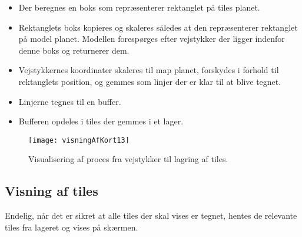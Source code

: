 \begin{itemize}
	\item Der beregnes en boks som repræsenterer rektanglet på tiles planet.
	\item Rektanglets boks kopieres og skaleres således at den repræsenterer rektanglet på model planet. Modellen forespørges efter vejstykker der ligger indenfor denne boks og returnerer dem.
	\item Vejstykkernes koordinater skaleres til map planet, forskydes i forhold til rektanglets position, og gemmes som linjer der er klar til at blive tegnet.
	\item Linjerne tegnes til en buffer.
	\item Bufferen opdeles i tiles der gemmes i et lager.
\end{itemize}

\begin{figure}[h]
	\centering
	\texttt{[image: visningAfKort13]}
	\captionsetup{width=0.8\textwidth}
	\caption{Visualisering af proces fra vejstykker til lagring af tiles.}
	\label{figur:visningAfKort13}
\end{figure}

\subsection{Visning af tiles}
\label{subsec:visningAfTiles}

Endelig, når det er sikret at alle tiles der skal vises er tegnet, hentes de relevante tiles fra lageret og vises på skærmen.